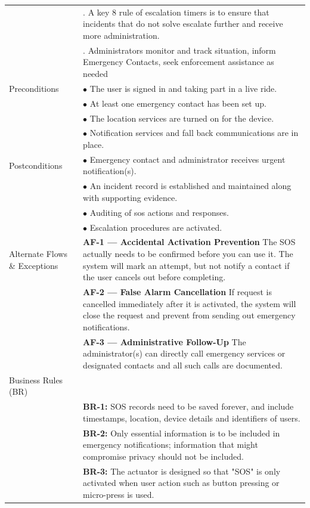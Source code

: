 \begin{longtable}{|>{\raggedright\arraybackslash}p{4cm}|>{\raggedright\arraybackslash}p{11cm}|}
& 8. A key 8 rule of escalation timers is to ensure that incidents that do not solve escalate further and receive more administration. \\
& 9. Administrators monitor and track situation, inform Emergency Contacts, seek enforcement assistance as needed \\
\hline
Preconditions & $\bullet$ The user is signed in and taking part in a live ride. \\
& $\bullet$ At least one emergency contact has been set up. \\
& $\bullet$ The location services are turned on for the device. \\
& $\bullet$ Notification services and fall back communications are in place. \\
\hline
Postconditions & $\bullet$ Emergency contact and administrator receives urgent notification(s). \\
& $\bullet$ An incident record is established and maintained along with supporting evidence. \\
& $\bullet$ Auditing of sos actions and responses. \\
& $\bullet$ Escalation procedures are activated. \\
\hline
Alternate Flows \& Exceptions & \textbf{AF-1 — Accidental Activation Prevention} \newline The SOS actually needs to be confirmed before you can use it. The system will mark an attempt, but not notify a contact if the user cancels out before completing. \\
& \textbf{AF-2 — False Alarm Cancellation} \newline If request is cancelled immediately after it is activated, the system will close the request and prevent from sending out emergency notifications. \\
& \textbf{AF-3 — Administrative Follow-Up} \newline The administrator(s) can directly call emergency services or designated contacts and all such calls are documented. \\
\hline
Business Rules (BR) & \\
& \textbf{BR-1:} SOS records need to be saved forever, and include timestamps, location, device details and identifiers of users. \\
& \textbf{BR-2:} Only essential information is to be included in emergency notifications; information that might compromise privacy should not be included. \\
& \textbf{BR-3:} The actuator is designed so that "SOS" is only activated when user action such as button pressing or micro-press is used. \\

\end{longtable}
